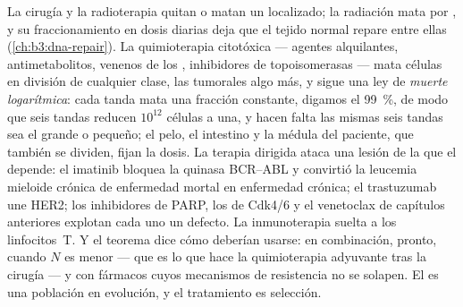 \begin{example}\label{ex:b3:cancer-biology:therapy}
La cirugía y la radioterapia quitan o matan un  localizado; la
radiación mata por , y su fraccionamiento en dosis
diarias deja que el tejido normal repare entre ellas
(\cref{ch:b3:dna-repair}). La quimioterapia citotóxica --- agentes
alquilantes, antimetabolitos, venenos de los , inhibidores de
topoisomerasas --- mata células en división de cualquier clase, las
tumorales algo más, y sigue una ley de \emph{muerte logarítmica}: cada
tanda mata una fracción constante, digamos el \qty{99}{\%}, de modo que
seis tandas reducen $10^{12}$ células a una, y hacen falta las mismas
seis tandas sea el  grande o pequeño; el pelo, el intestino y la
médula del paciente, que también se dividen, fijan la dosis. La terapia
dirigida ataca una lesión de la que el  depende: el imatinib bloquea
la quinasa BCR--ABL y convirtió la leucemia mieloide crónica de
enfermedad mortal en enfermedad crónica; el trastuzumab une HER2; los
inhibidores de PARP, los de Cdk4/6 y el venetoclax de capítulos
anteriores explotan cada uno un defecto. La inmunoterapia suelta a los
linfocitos~T. Y el teorema dice cómo deberían usarse: en combinación,
pronto, cuando $N$ es menor --- que es lo que hace la quimioterapia
adyuvante tras la cirugía --- y con fármacos cuyos mecanismos de
resistencia no se solapen. El  es una población en evolución, y el
tratamiento es selección.
\end{example}

